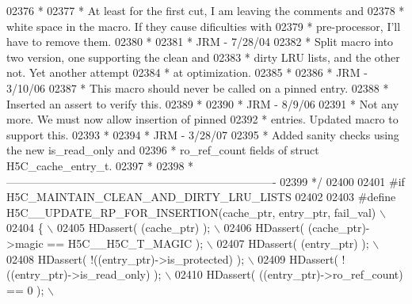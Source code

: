 \begin{DoxyCode}
02376 \textcolor{comment}{ *}
02377 \textcolor{comment}{ *      At least for the first cut, I am leaving the comments and}
02378 \textcolor{comment}{ *      white space in the macro.  If they cause dificulties with}
02379 \textcolor{comment}{ *      pre-processor, I'll have to remove them.}
02380 \textcolor{comment}{ *}
02381 \textcolor{comment}{ *      JRM - 7/28/04}
02382 \textcolor{comment}{ *      Split macro into two version, one supporting the clean and}
02383 \textcolor{comment}{ *      dirty LRU lists, and the other not.  Yet another attempt}
02384 \textcolor{comment}{ *      at optimization.}
02385 \textcolor{comment}{ *}
02386 \textcolor{comment}{ *      JRM - 3/10/06}
02387 \textcolor{comment}{ *      This macro should never be called on a pinned entry.}
02388 \textcolor{comment}{ *      Inserted an assert to verify this.}
02389 \textcolor{comment}{ *}
02390 \textcolor{comment}{ *      JRM - 8/9/06}
02391 \textcolor{comment}{ *      Not any more.  We must now allow insertion of pinned}
02392 \textcolor{comment}{ *      entries.  Updated macro to support this.}
02393 \textcolor{comment}{ *}
02394 \textcolor{comment}{ *      JRM - 3/28/07}
02395 \textcolor{comment}{ *      Added sanity checks using the new is\_read\_only and}
02396 \textcolor{comment}{ *      ro\_ref\_count fields of struct H5C\_cache\_entry\_t.}
02397 \textcolor{comment}{ *}
02398 \textcolor{comment}{ *-------------------------------------------------------------------------}
02399 \textcolor{comment}{ */}
02400 
02401 \textcolor{preprocessor}{#if H5C\_MAINTAIN\_CLEAN\_AND\_DIRTY\_LRU\_LISTS}
02402 
02403 \textcolor{preprocessor}{#define H5C\_\_UPDATE\_RP\_FOR\_INSERTION(cache\_ptr, entry\_ptr, fail\_val)       \(\backslash\)}
02404 \textcolor{preprocessor}{\{                                                                          \(\backslash\)}
02405 \textcolor{preprocessor}{    HDassert( (cache\_ptr) );                                               \(\backslash\)}
02406 \textcolor{preprocessor}{    HDassert( (cache\_ptr)->magic == H5C\_\_H5C\_T\_MAGIC );                    \(\backslash\)}
02407 \textcolor{preprocessor}{    HDassert( (entry\_ptr) );                                               \(\backslash\)}
02408 \textcolor{preprocessor}{    HDassert( !((entry\_ptr)->is\_protected) );                              \(\backslash\)}
02409 \textcolor{preprocessor}{    HDassert( !((entry\_ptr)->is\_read\_only) );                              \(\backslash\)}
02410 \textcolor{preprocessor}{    HDassert( ((entry\_ptr)->ro\_ref\_count) == 0 );                          \(\backslash\)}

\end{DoxyCode}
